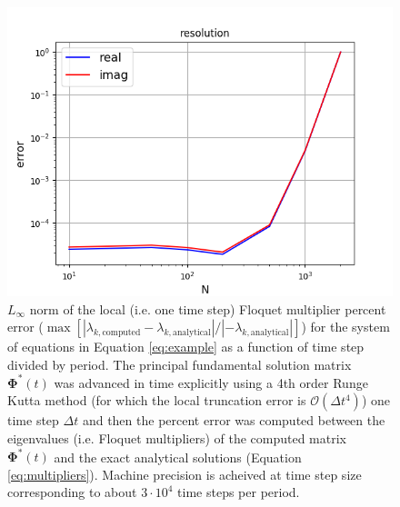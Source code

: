 \documentclass{article}
\begin{document}
\begin{figure}[h!]
\centering
\includegraphics[width=4.75in]{local_loglog_error.png}
\caption{$L_\infty$ norm of the local (i.e. one time step) Floquet multiplier percent error 
($\max[|\lambda_{k,\text{computed}}-\lambda_{k,\text{analytical}}|/|-\lambda_{k,\text{analytical}}|]$) for the system of equations 
in Equation \ref{eq:example} as a function of time step divided by period. 
The principal fundamental solution matrix $\boldsymbol{\Phi}^*(t)$
was advanced in time explicitly using a 4th order Runge Kutta method (for which the local truncation error is $\mathcal{O}(\Delta{t}^4)$) one time step $\Delta{t}$ 
and then the 
percent error was computed between the
eigenvalues 
(i.e. Floquet multipliers) of 
the computed matrix $\boldsymbol{\Phi}^*(t)$ and the exact analytical solutions (Equation \ref{eq:multipliers}). Machine precision is acheived at time step 
size corresponding to about $3\cdot10^4$ time steps per period.}
\end{figure}
\end{document}
